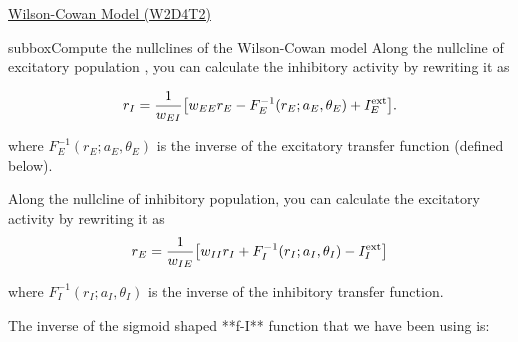 \begin{textbox}{\href{https://compneuro.neuromatch.io/tutorials/W2D4_DynamicNetworks/chapter_title.html}{Wilson-Cowan Model (W2D4T2)} }

\begin{subbox}{subbox}{Compute the nullclines of the Wilson-Cowan model}
\scriptsize
Along the nullcline of excitatory population , you can calculate the inhibitory activity by rewriting it as 

\begin{align*}
r_I = \frac{1}{w_{EI}}\big{[}w_{EE}r_E - F_E^{-1}(r_E; a_E,\theta_E) + I^{\text{ext}}_E \big{]}.
\end{align*}

where $F_E^{-1}(r_E; a_E,\theta_E)$ is the inverse of the excitatory transfer function (defined below). 

Along the nullcline of inhibitory population, you can calculate the excitatory activity by rewriting it as  
\begin{align*}
r_E = \frac{1}{w_{IE}} \big{[} w_{II}r_I + F_I^{-1}(r_I;a_I,\theta_I) - I^{\text{ext}}_I \big{]}  
\end{align*}

where $F_I^{-1}(r_I; a_I,\theta_I)$ is the inverse of the inhibitory transfer function.

The inverse of the sigmoid shaped **f-I** function that we have been using is:


\end{subbox}
\end{textbox}
